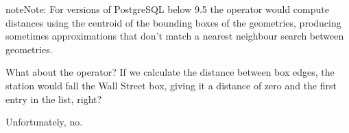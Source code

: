 \documentclass[a4paper,11pt,english]{sphinxmanual}
\begin{document}
\begin{sphinxadmonition}{note}{Note:}
For versions of PostgreSQL below 9.5 the \sphinxstylestrong{\textless{}-\textgreater{}} operator would compute distances using the centroid of the bounding boxes of the geometries, producing sometimes approximations that don’t match a nearest neighbour search between geometries.
\end{sphinxadmonition}

What about the \sphinxstylestrong{\textless{}\#\textgreater{}} operator? If we calculate the distance between box edges, the station would fall  the Wall Street box, giving it a distance of zero and the first entry in the list, right?

\begin{sphinxVerbatim}[commandchars=\\\{\}]
   
 
   
 
\end{sphinxVerbatim}

Unfortunately, no.
\end{document}

